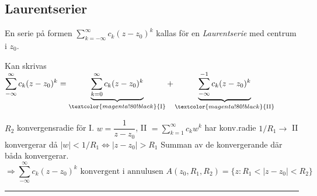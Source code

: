 \subsection{Laurentserier}
\begin{definition}
En serie på formen $\sum_{k = -\infty}^\infty c_k(z - z_0)^k$ kallas för en \emph{Laurentserie} med centrum i $z_0$.
\end{definition}

Kan skrivas $\displaystyle\sum_{-\infty}^\infty c_k(z - z_0)^k = \underbrace{\sum_{k = 0}^\infty c_k(z - z_0)^k}_{\textcolor{magenta!80!black}{\text{I}}} + \underbrace{\sum_{-\infty}^{-1} c_k(z - z_0)^k}_{\textcolor{magenta!80!black}{\text{II}}}$

$R_2$ konvergensradie för I. $w = \dfrac{1}{z - z_0}$, II $= \sum_{k = 1}^\infty c_k w^k$ har konv.radie $1/R_1 \to$ II konvergerar då $|w| < 1/R_1 \Leftrightarrow |z - z_0| > R_1$
\textcolor{magenta!80!black}{Summan av de konvergerande där båda konvergerar.}
\[ \Rightarrow \sum_{-\infty}^\infty c_k(z - z_0)^k \text{ konvergent i annulusen } A(z_0, R_1, R_2) = \{z : R_1 < |z - z_0| < R_2\} \]

\noindent\rule{\linewidth}{0.4pt}

